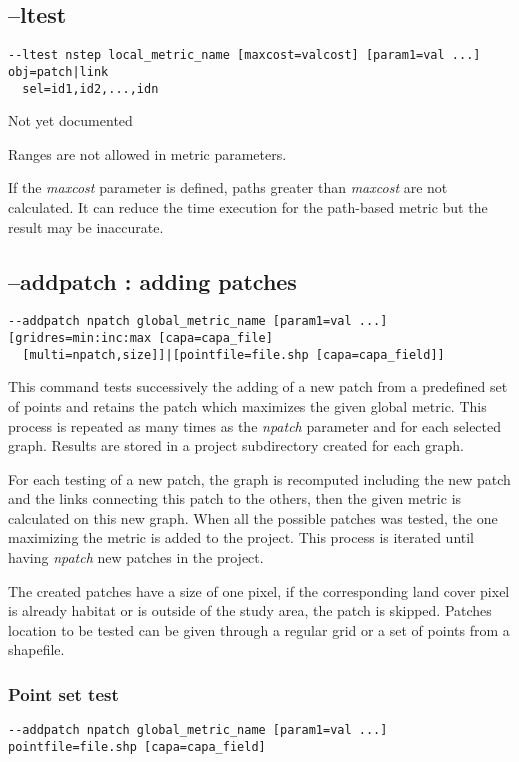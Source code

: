 \documentclass[a4paper,10pt]{report}
\begin{document}
\subsection{--ltest}
\begin{verbatim}
--ltest nstep local_metric_name [maxcost=valcost] [param1=val ...] obj=patch|link 
  sel=id1,id2,...,idn
\end{verbatim}

Not yet documented

Ranges are not allowed in metric parameters.

If the \textit{maxcost} parameter is defined, paths greater than \textit{maxcost} are not calculated. It can reduce the time execution for the path-based metric but the result may be inaccurate.

\subsection{--addpatch : adding patches}
\begin{verbatim}
--addpatch npatch global_metric_name [param1=val ...] [gridres=min:inc:max [capa=capa_file] 
  [multi=npatch,size]]|[pointfile=file.shp [capa=capa_field]]
\end{verbatim}

This command tests successively the adding of a new patch from a predefined set of points and retains the patch which maximizes the given global metric.
This process is repeated as many times as the \textit{npatch} parameter and for each selected graph. 
Results are stored in a project subdirectory created for each graph.

For each testing of a new patch, the graph is recomputed including the new patch and the links connecting this patch to the others, then the given metric is calculated on this new graph.
When all the possible patches was tested, the one maximizing the metric is added to the project.
This process is iterated until having \textit{npatch} new patches in the project.

The created patches have a size of one pixel, if the corresponding land cover pixel is already habitat or is outside of the study area, the patch is skipped.
Patches location to be tested can be given through a regular grid or a set of points from a shapefile.

\subsubsection{Point set test}
\begin{verbatim}
--addpatch npatch global_metric_name [param1=val ...] pointfile=file.shp [capa=capa_field]
\end{verbatim}
\end{document}
